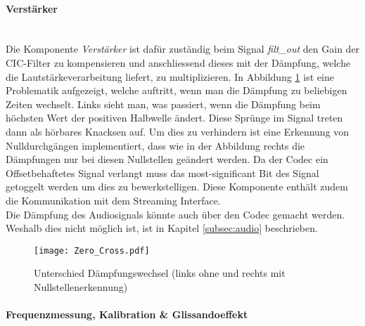 \paragraph{Verstärker}\mbox{}\\

Die Komponente \textit{Verstärker} ist dafür zuständig beim Signal \textit{filt\_out} den Gain der CIC-Filter zu kompensieren und anschliessend dieses mit der Dämpfung, welche die Lautstärkeverarbeitung liefert, zu multiplizieren. In Abbildung \ref{img:Zero_Cross} ist eine Problematik aufgezeigt, welche auftritt, wenn man die Dämpfung zu beliebigen Zeiten wechselt. Links sieht man, was passiert, wenn die Dämpfung beim höchsten Wert der positiven Halbwelle ändert. Diese Sprünge im Signal treten dann als hörbares Knacksen auf. Um dies zu verhindern ist eine Erkennung von Nulldurchgängen implementiert, dass wie in der Abbildung rechts die Dämpfungen nur bei diesen Nullstellen geändert werden. Da der Codec ein Offsetbehaftetes Signal verlangt muss das most-significant Bit des Signal getoggelt werden um dies zu bewerkstelligen. Diese Komponente enthält zudem die Kommunikation mit dem Streaming Interface. \\
Die Dämpfung des Audiosignals könnte auch über den Codec gemacht werden. Weshalb dies nicht möglich ist, ist in Kapitel \ref{subsec:audio} beschrieben. 
	
\begin{figure}[h!]
	\centering
	\texttt{[image: Zero\_Cross.pdf]}
	\caption{Unterschied Dämpfungswechsel (links ohne und rechts mit Nullstellenerkennung)} 
	\label{img:Zero_Cross}
\end{figure}  


\paragraph{Frequenzmessung, Kalibration \& Glissandoeffekt}\mbox{}\\

